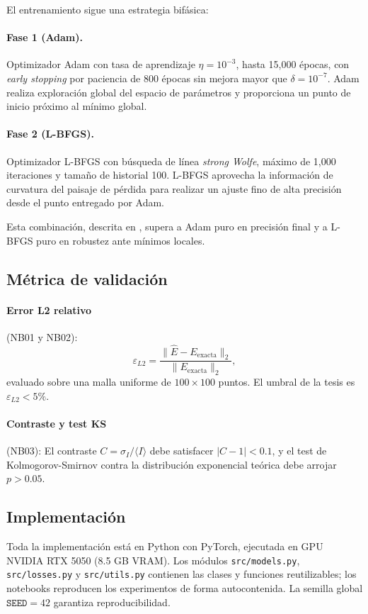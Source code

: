 El entrenamiento sigue una estrategia bifásica:

\paragraph{Fase 1 (Adam).}
Optimizador Adam con tasa de aprendizaje $\eta = 10^{-3}$, hasta 15{,}000 épocas,
con \textit{early stopping} por paciencia de 800 épocas sin mejora mayor que
$\delta = 10^{-7}$.
Adam realiza exploración global del espacio de parámetros y proporciona un punto
de inicio próximo al mínimo global.

\paragraph{Fase 2 (L-BFGS).}
Optimizador L-BFGS con búsqueda de línea \textit{strong Wolfe}, máximo de 1{,}000
iteraciones y tamaño de historial 100.
L-BFGS aprovecha la información de curvatura del paisaje de pérdida para realizar
un ajuste fino de alta precisión desde el punto entregado por Adam.

Esta combinación, descrita en \citet{Wang2021_failurePINNs}, supera a Adam puro en
precisión final y a L-BFGS puro en robustez ante mínimos locales.

\subsection{Métrica de validación}
\label{subsec:metricas}

\paragraph{Error L2 relativo} (NB01 y NB02):
%
\begin{equation}
  \varepsilon_{L2} = \frac{\|\hat{E} - E_{\mathrm{exacta}}\|_2}{\|E_{\mathrm{exacta}}\|_2},
  \label{eq:l2}
\end{equation}
%
evaluado sobre una malla uniforme de $100 \times 100$ puntos.
El umbral de la tesis es $\varepsilon_{L2} < 5\%$.

\paragraph{Contraste y test KS} (NB03):
El contraste $C = \sigma_I / \langle I \rangle$ debe satisfacer $|C - 1| < 0.1$,
y el test de Kolmogorov-Smirnov contra la distribución exponencial teórica debe
arrojar $p > 0.05$.

\subsection{Implementación}
\label{subsec:implementacion}

Toda la implementación está en Python con PyTorch, ejecutada en GPU NVIDIA RTX 5050
(8.5 GB VRAM).
Los módulos \texttt{src/models.py}, \texttt{src/losses.py} y \texttt{src/utils.py}
contienen las clases y funciones reutilizables; los notebooks reproducen los experimentos
de forma autocontenida.
La semilla global $\texttt{SEED} = 42$ garantiza reproducibilidad.

